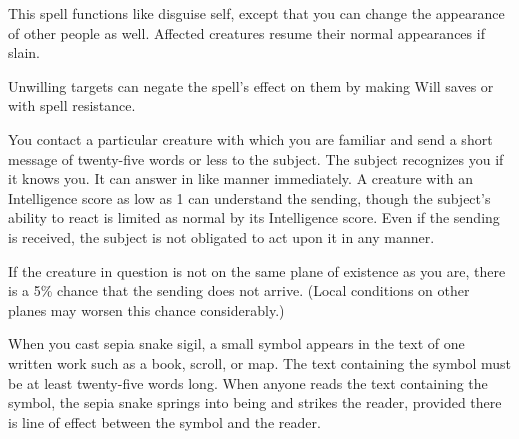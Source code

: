 \begin{multicols}{2}
\begin{small}

\noindent This spell functions like disguise self, except that you can change the appearance of other people as well. Affected creatures resume their normal appearances if slain.

\smallskip\noindent Unwilling targets can negate the spell's effect on them by making Will saves or with spell resistance.

\noindent You contact a particular creature with which you are familiar and send a short message of twenty-five words or less to the subject. The subject recognizes you if it knows you. It can answer in like manner immediately. A creature with an Intelligence score as low as 1 can understand the sending, though the subject's ability to react is limited as normal by its Intelligence score. Even if the sending is received, the subject is not obligated to act upon it in any manner.

\smallskip\noindent If the creature in question is not on the same plane of existence as you are, there is a 5\% chance that the sending does not arrive. (Local conditions on other planes may worsen this chance considerably.)


\noindent When you cast sepia snake sigil, a small symbol appears in the text of one written work such as a book, scroll, or map. The text containing the symbol must be at least twenty-five words long. When anyone reads the text containing the symbol, the sepia snake springs into being and strikes the reader, provided there is line of effect between the symbol and the reader.


\end{small}
\end{multicols}
